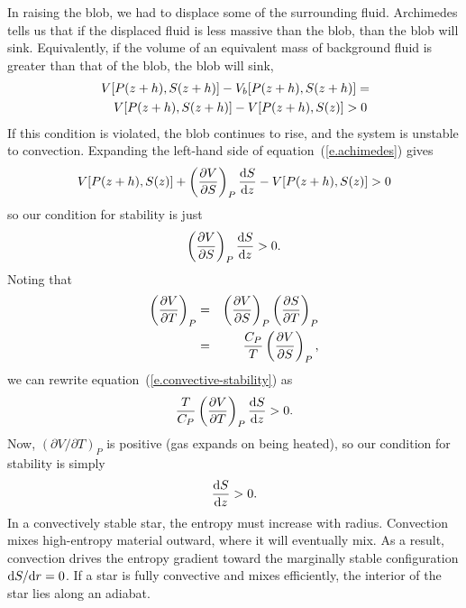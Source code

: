 In raising the blob, we had to displace some of the surrounding fluid. Archimedes tells us that if the displaced fluid is less massive than the blob, than the blob will sink.  Equivalently, if the volume of an equivalent mass of background fluid is greater than that of the blob, the blob will sink,
\begin{eqnarray}
\lefteqn{V[P(z+h),S(z+h)] - V_{b}[P(z+h),S(z+h)] =}\nonumber\\
&&  V[P(z+h),S(z+h)] - V[P(z+h),S(z)] > 0
\label{e.achimedes}
\end{eqnarray}
If this condition is violated, the blob continues to rise, and the system is unstable to convection.  Expanding the left-hand side of equation~(\ref{e.achimedes}) gives
\[
V[P(z+h),S(z)] + \left(\frac{\partial V}{\partial S}\right)_{P}\frac{\mathrm{d} S}{\mathrm{d} z} - V[P(z+h),S(z)] > 0 
\]
so our condition for stability is just
\begin{equation}\label{e.convective-stability}
\left(\frac{\partial V}{\partial S}\right)_{P}\frac{\mathrm{d} S}{\mathrm{d} z} > 0.
\end{equation}
Noting that
\begin{eqnarray*}
\left(\frac{\partial V}{\partial T}\right)_{P} &=& \left(\frac{\partial V}{\partial S}\right)_{P}\left(\frac{\partial S}{\partial T}\right)_{P}\\
 &=& \frac{C_{P}}{T}\left(\frac{\partial V}{\partial S}\right)_{P},
 \end{eqnarray*}
 we can rewrite equation~(\ref{e.convective-stability}) as
 \[
 \frac{T}{C_{P}}\left(\frac{\partial V}{\partial T}\right)_{P}\frac{\mathrm{d} S}{\mathrm{d} z} > 0.
 \]
 Now, $(\partial V/\partial T)_{P}$ is positive (gas expands on being heated), so our condition for stability is simply
 \begin{equation}\label{e.entropy-condition}
\frac{\mathrm{d} S}{\mathrm{d} z} > 0.
\end{equation}
In a convectively stable star, the entropy must increase with radius. Convection mixes high-entropy material outward, where it will eventually mix.  As a result, convection drives the entropy gradient toward the marginally stable configuration $\mathrm{d} S/\mathrm{d} r = 0$.  If a star is fully convective and mixes efficiently, the interior of the star lies along an adiabat. 

